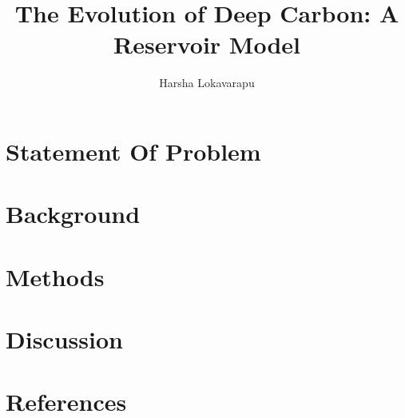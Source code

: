 \documentclass[review]{elsarticle}
\begin{document}
\begin{frontmatter}
\title{\textbf{The Evolution of Deep Carbon: A Reservoir Model}}
\address[address1]{Department of Earth and Planetary Sciences, University of California, Davis, CA 95616, USA}

\author[address1]{Harsha Lokavarapu }

\date{}
\begin{abstract}

\end{abstract}
\end{frontmatter}

\section{Statement Of Problem}
  
 
\section{Background}


% 

\section{Methods}


\section{Discussion}

  
\newpage
\section*{References}
 

\end{document}
